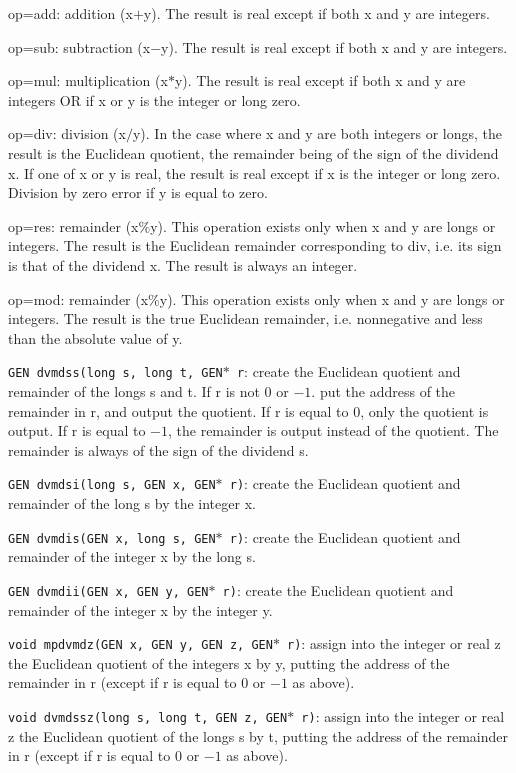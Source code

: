 op=add: addition (x$+$y). The result is real except if both x and y are
integers.

op=sub: subtraction (x$-$y). The result is real except if both x and y are
integers.

op=mul: multiplication (x$*$y). The result is real except if both x and y are
integers OR if x or y is the integer or long zero.

op=div: division (x$/$y). In the case where x and y are both integers or longs,
the result is the Euclidean quotient, the remainder being of the sign of the
dividend x. If one of x or y is real, the result is real except if x is the
integer or long zero. Division by zero error if y is equal to zero.

op=res: remainder (x$\%$y). This operation exists only when x and y are longs
or integers. The result is the Euclidean remainder corresponding to div, i.e.
its sign is that of the dividend x. The result is always an integer.

op=mod: remainder (x$\%$y). This operation exists only when x and y are longs
or integers. The result is the true Euclidean remainder, i.e. nonnegative
and less than the absolute value of y.


{\tt GEN dvmdss(long s, long t, GEN$*$ r}: create the Euclidean quotient and
remainder of the longs s and t. If r is not 0 or $-1$. put the address of the
remainder in r, and output the quotient. If r is equal to 0, only the
quotient is output. If r is equal to $-1$, the remainder is output instead
of the quotient. The remainder is always of the sign of the dividend s.

{\tt GEN dvmdsi(long s, GEN x, GEN$*$ r)}: create the Euclidean quotient and
remainder of the long s by the integer x.

{\tt GEN dvmdis(GEN x, long s, GEN$*$ r)}: create the Euclidean quotient and
remainder of the integer x by the long s.

{\tt GEN dvmdii(GEN x, GEN y, GEN$*$ r)}: create the Euclidean quotient and
remainder of the integer x by the integer y.

{\tt void mpdvmdz(GEN x, GEN y, GEN z, GEN$*$ r)}: assign into the integer or
real z the Euclidean quotient of the integers x by y, putting the address of 
the remainder in r (except if r is equal to 0 or $-1$ as above).

{\tt void dvmdssz(long s, long t, GEN z, GEN$*$ r)}: assign into the integer or
real z the Euclidean quotient of the longs s by t, putting the address of 
the remainder in r (except if r is equal to 0 or $-1$ as above).

